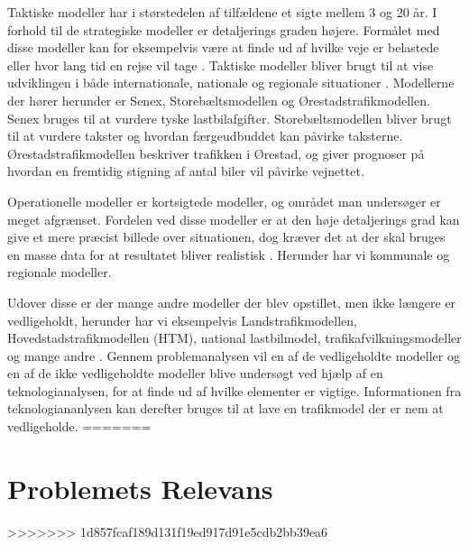\vspace{5mm}

Taktiske modeller har i størstedelen af tilfældene et sigte mellem 3 og 20 år. I forhold til de strategiske modeller er detaljerings graden højere. Formålet med disse modeller kan for eksempelvis være at finde ud af hvilke veje er belastede eller hvor lang tid en rejse vil tage \cite[s1]{dtfnotat}. Taktiske modeller bliver brugt til at vise udviklingen i både internationale, nationale og regionale situationer \cite[s. 9]{dtfnotat}. Modellerne der hører herunder er Senex, Storebæltsmodellen og Ørestadstrafikmodellen. Senex bruges til at vurdere tyske lastbilafgifter. Storebæltsmodellen bliver brugt til at vurdere takster og hvordan færgeudbuddet kan påvirke taksterne. Ørestadstrafikmodellen beskriver trafikken i Ørestad, og giver prognoser på hvordan en fremtidig stigning af antal biler vil påvirke vejnettet.

\vspace{5mm}

Operationelle modeller er kortsigtede modeller, og området man undersøger er meget afgrænset. Fordelen ved disse modeller er at den høje detaljerings grad kan give et mere præcist billede over situationen, dog kræver det at der skal bruges en masse data for at resultatet bliver realistisk \cite[s. 1]{dtfnotat}. Herunder har vi kommunale og regionale modeller.

\vspace{5mm}

Udover disse er der mange andre modeller der blev opstillet, men ikke længere er vedligeholdt, herunder har vi eksempelvis Landstrafikmodellen, Hovedstadstrafikmodellen (HTM), national lastbilmodel, trafikafvilkningsmodeller og mange andre \cite[s. 8]{dtfnotat}. Gennem problemanalysen vil en af de vedligeholdte modeller og en af de ikke vedligeholdte modeller blive undersøgt ved hjælp af en teknologianalysen, for at finde ud af hvilke elementer er vigtige. Informationen fra teknologiananlysen kan derefter bruges til at lave en trafikmodel der er nem at vedligeholde.
=======
\chapter{Problemets Relevans}\label{Problemets-Relevans}
>>>>>>> 1d857fcaf189d131f19ed917d91e5cdb2bb39ea6
